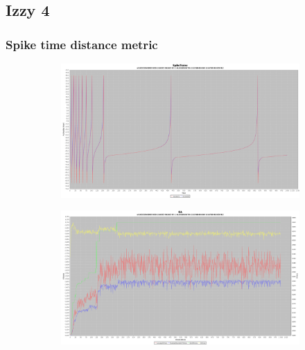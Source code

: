 \documentclass[12pt]{article}
\begin{document}
	\subsection{Izzy 4}
		\subsubsection{Spike time distance metric}
			\begin{figure}[H]
				\centering
					\begin{subfigure}{.5\textwidth}
						\centering
						\includegraphics[width=\linewidth]{./../images/izzy4/time/plot.png}
						
						\label{fig:sub10a}
					\end{subfigure}%
					\begin{subfigure}{.5\textwidth}
						\centering
						\includegraphics[width=\linewidth]{./../images/izzy4/time/prog.png}
						
						\label{fig:sub10b}
					\end{subfigure}
					
					\label{fig:plot10}
			\end{figure}
			
\end{document}
